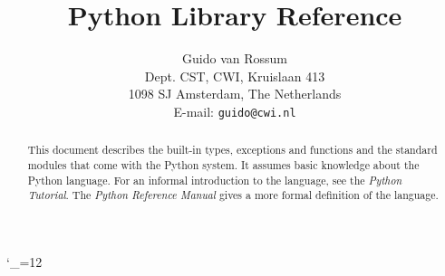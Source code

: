 

\catcode`_=12

\newcommand{\cbstart}{}
\newcommand{\cbend}{}

\newcommand{\itembreak}{
\mbox{}
\\*[0mm]
}

\newcommand{\itemjoin}{
\mbox{}
\vspace{-\itemsep}
\vspace{-\parsep}
}

\newcommand{\funcitem}[2]{
\index{#1@{\tt#1}}
\item[{\tt #1(#2)}]
\ 
}

\newcommand{\dataitem}[1]{
\index{#1@{\tt#1}}
\item[{\tt #1}]
\ 
}

\newcommand{\excitem}[2]{
\index{#1@{\tt#1}}
\item[{\tt #1 = '#2'}]
\itembreak
}

\title{\bf
	Python Library Reference
}

\author{
	Guido van Rossum \\
	Dept. CST, CWI, Kruislaan 413 \\
	1098 SJ Amsterdam, The Netherlands \\
	E-mail: {\tt guido@cwi.nl}
}

\makeindex




\maketitle

\begin{abstract}

\noindent
This document describes the built-in types, exceptions and functions
and the standard modules that come with the Python system.  It assumes
basic knowledge about the Python language.  For an informal
introduction to the language, see the {\em Python Tutorial}.  The {\em
Python Reference Manual} gives a more formal definition of the
language.

\end{abstract}

\pagebreak

\tableofcontents

\pagebreak




